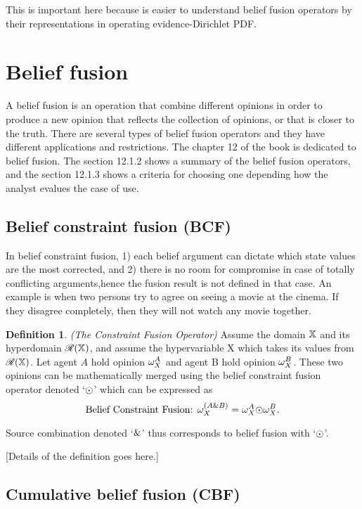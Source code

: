 \documentclass[a4paper,12pt]{article}
\theoremstyle{definition}
\newtheorem{definition}{Definition}[section]
\theoremstyle{theorem}
\numberwithin{equation}{section}
\begin{document}
This is important here because is easier to understand belief fusion operators by their representations in operating evidence-Dirichlet PDF.


\section{Belief fusion}

A belief fusion is an operation that combine different opinions in order to produce a new opinion that reflects the collection of opinions, or that is closer to the truth. There are several types of belief fusion operators and they have different applications and restrictions. The chapter 12 of the book is dedicated to belief fusion. The section 12.1.2 shows a summary of the belief fusion operators, and the section 12.1.3 shows a criteria for choosing one depending how the analyst evalues the case of use.


\subsection{Belief constraint fusion (BCF)}

In belief constraint fusion, 1) each belief argument can dictate which state values are the most corrected, and 2) there is no room for compromise in case of totally conflicting arguments,hence the fusion result is not defined in that case. An example is when two persons try to agree on seeing a movie at the cinema. If they disagree completely, then they will not watch any movie together.

\begin{definition}
\emph{(The Constraint Fusion Operator)} Assume the domain $\mathbb{X}$ and its hyperdomain $\mathcal{R}(\mathbb{X})$, and assume the hypervariable X which takes its values from $\mathcal{R}(\mathbb{X})$. Let agent $A$ hold opinion $\omega^{A}_{X}$ and agent B hold opinion $\omega^{B}_{X}$. These two opinions can be mathematically merged using the belief constraint fusion operator denoted `$\bcf$' which can be expressed as
\begin{equation}
\text{Belief Constraint Fusion: } \opia{(A\&B)}{X} = \opia{A}{X} \bcf \opia{B}{X}\text{.}
\end{equation}

Source combination denoted `$\&$' thus corresponds to belief fusion with `$\bcf$'.

[Details of the definition goes here.]
\end{definition}


\subsection{Cumulative belief fusion (CBF)}
\end{document}
